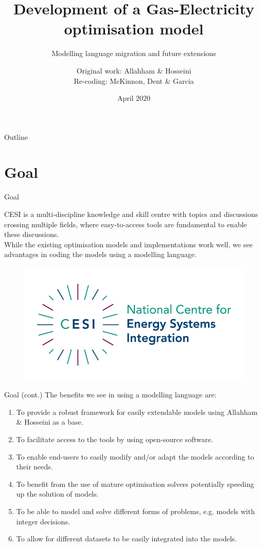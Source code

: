\documentclass[handout]{beamer}
\title[Development of a Coordinated Gas-Electricity optimisation model]{\normalsize{Development of a Gas-Electricity optimisation model}}
\subtitle{\small{Modelling language migration and future extensions}}
\author{Original work: Allahham \& Hosseini\\ Re-coding: McKinnon, Dent \& Garcia}
\institute{National Centre for Energy System Integration (CESI)}
\date{April 2020}
\begin{document}
\begin{frame}
  \titlepage
\end{frame}

\begin{frame}{Outline}
  \tableofcontents
\end{frame}

\section{Goal}

\begin{frame}[t]{Goal}

  CESI is a multi-discipline knowledge and skill centre with topics and discussions crossing multiple fields, where easy-to-access tools are fundamental to enable these discussions.\\[12pt]

  While the existing optimisation models and implementations work well, we see advantages in coding the models using a modelling language.

  \begin{figure}
  \begin{center}
  \includegraphics[width=.60\textwidth]{CESI.png}
  \end{center}
  \end{figure}

\end{frame}


\begin{frame}[t]{Goal (cont.)}
  \vspace{0.5cm}
  The benefits we see in using a modelling language are:\\[12pt]

  \begin{enumerate}
    \item To provide a robust framework for easily extendable models using Allahham \& Hosseini as a base.
    \item To facilitate access to the tools by using open-source software.
    \item To enable end-users to easily modify and/or adapt the models according to their needs.
    \item To benefit from the use of mature optimisation solvers potentially speeding up the solution of models.
    \item To be able to model and solve different forms of problems, e.g. models with integer decisions.
    \item To allow for different datasets to be easily integrated into the models.
  \end{enumerate}

\end{frame}
\end{document}
